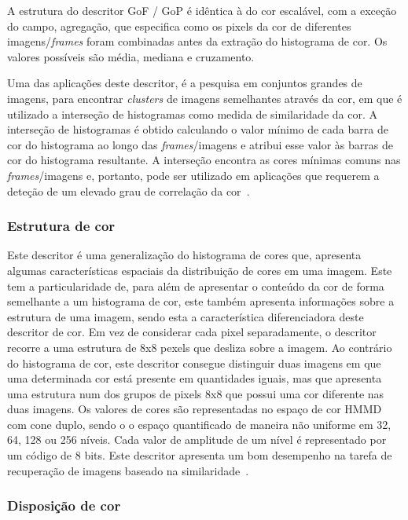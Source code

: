 A estrutura do descritor GoF / GoP é idêntica à do cor escalável, com a exceção do campo, agregação, que especifica como os pixels da cor de diferentes imagens/\textit{frames} foram combinadas antes da extração do histograma de cor. Os valores possíveis são média, mediana e cruzamento. 

Uma das aplicações deste descritor, é a pesquisa em conjuntos grandes de imagens, para encontrar \textit{clusters} de imagens semelhantes através da cor, em que é utilizado a interseção de histogramas como medida de similaridade da cor. A interseção de histogramas é obtido calculando o valor mínimo de cada barra de cor do histograma ao longo das \textit{frames}/imagens e atribui esse valor às barras de cor do histograma resultante. A interseção encontra as cores mínimas comuns nas \textit{frames}/imagens e, portanto, pode ser utilizado em aplicações que requerem a deteção de um elevado grau de correlação da cor~\cite{Christopoulos2000}. 

\subsubsection{Estrutura de cor}

Este descritor é uma generalização do histograma de cores que, apresenta algumas características espaciais da distribuição de cores em uma imagem. Este tem a particularidade de, para além de apresentar o conteúdo da cor de forma semelhante a um histograma de cor, este também apresenta informações sobre a estrutura de uma imagem, sendo esta a característica diferenciadora deste descritor de cor. Em vez de considerar cada pixel separadamente, o descritor recorre a uma estrutura de 8x8 pexels que desliza sobre a imagem. Ao contrário do histograma de cor, este descritor consegue distinguir duas imagens em que uma determinada cor está presente em quantidades iguais, mas que apresenta uma estrutura num dos grupos de pixels 8x8 que possui uma  cor diferente nas duas imagens. Os valores de cores são representadas no espaço de cor HMMD com cone duplo, sendo o o espaço quantificado de maneira não uniforme em 32, 64, 128 ou 256 níveis. 
Cada valor de amplitude de um nível é representado por um código de 8 bits. Este descritor apresenta um bom desempenho na tarefa de recuperação de imagens baseado na similaridade~\cite{Modi2008}.

\subsubsection{Disposição de cor}

